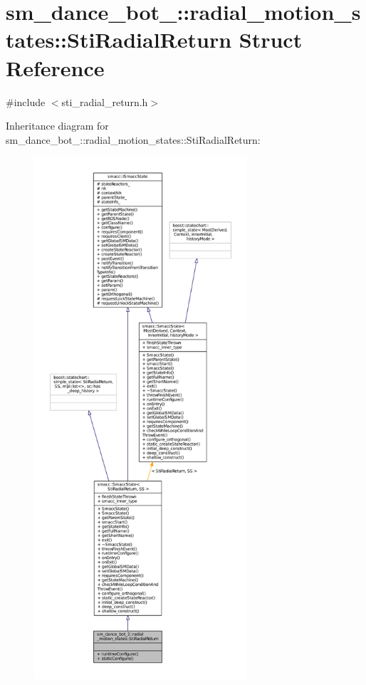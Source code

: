 \hypertarget{structsm__dance__bot__2_1_1radial__motion__states_1_1StiRadialReturn}{}\section{sm\+\_\+dance\+\_\+bot\+\_\+:\+:radial\+\_\+motion\+\_\+states\+:\+:Sti\+Radial\+Return Struct Reference}
\label{structsm__dance__bot__2_1_1radial__motion__states_1_1StiRadialReturn}


{\ttfamily \#include $<$sti\+\_\+radial\+\_\+return.\+h$>$}



Inheritance diagram for sm\+\_\+dance\+\_\+bot\+\_\+:\+:radial\+\_\+motion\+\_\+states\+:\+:Sti\+Radial\+Return\+:
\nopagebreak
\begin{figure}[H]
\begin{center}
\leavevmode
\includegraphics[height=550pt]{structsm__dance__bot__2_1_1radial__motion__states_1_1StiRadialReturn__inherit__graph}
\end{center}
\end{figure}



